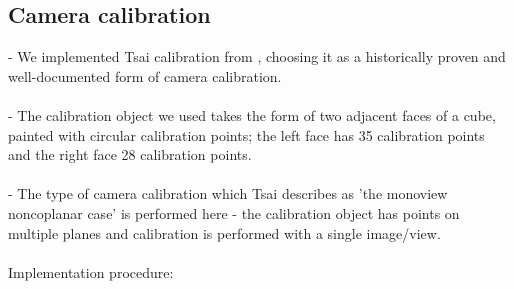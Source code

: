 \subsection{Camera calibration}

- We implemented Tsai calibration from \cite{TSAI}, choosing it as a historically proven and well-documented form of camera calibration.\\\\
- The calibration object we used takes the form of two adjacent faces of a cube, painted with circular calibration points; the left face has 35 calibration points and the right face 28 calibration points.\\\\
- The type of camera calibration which Tsai describes as 'the monoview noncoplanar case' is performed here - the calibration object has points on multiple planes and calibration is performed with a single image/view.\\\\
Implementation procedure:
